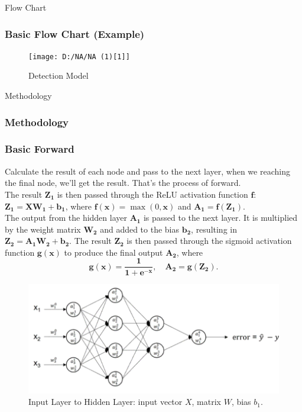 \documentclass[aspectratio=1610]{beamer}
\begin{document}
\begin{frame}{Flow Chart}
    \frametitle{Basic Flow Chart (Example)}
        \begin{figure}
        \centering
        \texttt{[image: D:/NA/NA (1)[1]]}
        \caption{Detection Model}
        \label{fig:enter-label}
    \end{figure}
      
    
\end{frame}

\begin{frame}{Methodology}
    \frametitle{Methodology}


\end{frame}

\begin{frame}
    \frametitle{Basic Forward}
    Calculate the result of each node and pass to the next layer, when we reaching the final node, we’ll get the result. That’s the process of forward.
    \\The result $\boldsymbol{Z_1}$ is then passed through the ReLU activation function $\boldsymbol{f}$: 
    $\boldsymbol{Z_1} = \boldsymbol{X} \boldsymbol{W_1} + \boldsymbol{b_1}$, where $\boldsymbol{f(x)} = \max(0, \boldsymbol{x})$ and $\boldsymbol{A_1} = \boldsymbol{f(Z_1)}$.
    \\The output from the hidden layer $\boldsymbol{A_1}$ is passed to the next layer. It is multiplied by the weight matrix $\boldsymbol{W_2}$ and added to the bias $\boldsymbol{b_2}$, resulting in $\boldsymbol{Z_2} = \boldsymbol{A_1}\boldsymbol{W_2} + \boldsymbol{b_2}$. The result $\boldsymbol{Z_2}$ is then passed through the sigmoid activation function $\boldsymbol{g(x)}$ to produce the final output $\boldsymbol{A_2}$, where 
    \[
    \boldsymbol{g(x)} = \frac{\boldsymbol{1}}{\boldsymbol{1} + \boldsymbol{e}^{-\boldsymbol{x}}}, \quad \boldsymbol{A_2} = \boldsymbol{g(Z_2)}.
    \]

    
    \begin{figure}
        \centering
        \begin{minipage}{0.6\textwidth}
            \centering
            \includegraphics[width=\linewidth]{Forward.png}
        \end{minipage}%
        \hfill
        \begin{minipage}{0.35\textwidth}
            \centering
            \caption{Input Layer to Hidden Layer: input vector $X$, matrix $W$, bias $b_1$.}
            \label{fig:enter-label}
        \end{minipage}
    \end{figure}
\end{frame}
\end{document}
